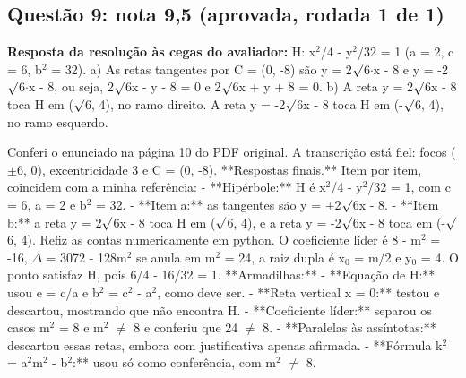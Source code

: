 \documentclass{article}%
\begin{document}
\subsection*{Questão 9: nota 9,5 (aprovada, rodada 1 de 1)}%
\textbf{Resposta da resolução às cegas do avaliador:} H: x$^2$/4 - y$^2$/32 = 1 (a = 2, c = 6, b$^2$ = 32).\newline%
a) As retas tangentes por C = (0, -8) são y = 2$\surd$6$\cdot$x - 8 e y = -2$\surd$6$\cdot$x - 8, ou seja, 2$\surd$6x - y - 8 = 0 e 2$\surd$6x + y + 8 = 0.\newline%
b) A reta y = 2$\surd$6x - 8 toca H em ($\surd$6, 4), no ramo direito. A reta y = -2$\surd$6x - 8 toca H em (-$\surd$6, 4), no ramo esquerdo.\par %
Conferi o enunciado na página 10 do PDF original. A transcrição está fiel: focos ($\pm$6, 0), excentricidade 3 e C = (0, -8).\newline%
\newline%
**Respostas finais.** Item por item, coincidem com a minha referência:\newline%
{-} **Hipérbole:** H é x$^2$/4 - y$^2$/32 = 1, com c = 6, a = 2 e b$^2$ = 32.\newline%
{-} **Item a:** as tangentes são y = $\pm$2$\surd$6x - 8.\newline%
{-} **Item b:** a reta y = 2$\surd$6x - 8 toca H em ($\surd$6, 4), e a reta y = -2$\surd$6x - 8 toca em (-$\surd$6, 4).\newline%
\newline%
Refiz as contas numericamente em python. O coeficiente líder é 8 - m$^2$ = -16, $\Delta$ = 3072 - 128m$^2$ se anula em m$^2$ = 24, a raiz dupla é x$_{0}$ = m/2 e y$_{0}$ = 4. O ponto satisfaz H, pois 6/4 - 16/32 = 1.\newline%
\newline%
**Armadilhas:**\newline%
{-} **Equação de H:** usou e = c/a e b$^2$ = c$^2$ - a$^2$, como deve ser.\newline%
{-} **Reta vertical x = 0:** testou e descartou, mostrando que não encontra H.\newline%
{-} **Coeficiente líder:** separou os casos m$^2$ = 8 e m$^2$ $\neq$ 8 e conferiu que 24 $\neq$ 8.\newline%
{-} **Paralelas às assíntotas:** descartou essas retas, embora com justificativa apenas afirmada.\newline%
{-} **Fórmula k$^2$ = a$^2$m$^2$ - b$^2$:** usou só como conferência, com m$^2$ $\neq$ 8.\newline%
\end{document}
